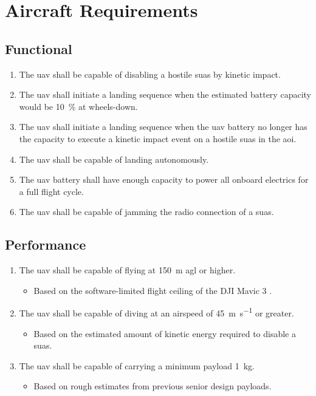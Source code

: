\chapter{Aircraft Requirements}\label{cp:aircraft_reqs}

\section{Functional}\label{sec:functional}

\begin{enumerate}
    \item The \acrshort{uav} shall be capable of disabling a hostile \acrshort{suas} by kinetic impact.
    \item The \acrshort{uav} shall initiate a landing sequence when the estimated battery capacity would be \qty{10}{\percent} at wheels-down.
    \item The \acrshort{uav} shall initiate a landing sequence when the \acrshort{uav} battery no longer has the capacity to execute a kinetic impact event on a hostile \acrshort{suas} in the \acrshort{aoi}.
    \item The \acrshort{uav} shall be capable of landing autonomously.
    \item The \acrshort{uav} battery shall have enough capacity to power all onboard electrics for a full flight cycle.
    \item The \acrshort{uav} shall be capable of jamming the radio connection of a \acrshort{suas}.
\end{enumerate}

\section{Performance}\label{sec:performance}

\begin{enumerate}
    \item The \acrshort{uav} shall be capable of flying at \qty{150}{\meter} \acrfull{agl} or higher.
    \begin{itemize}
        \item Based on the software-limited flight ceiling of the DJI Mavic 3 \citep{dji_mavic_3}.
    \end{itemize}
    \item The \acrshort{uav} shall be capable of diving at an airspeed of \qty{45}{\meter\per\second} or greater.
    \begin{itemize}
        \item Based on the estimated amount of kinetic energy required to disable a \acrshort{suas}.
    \end{itemize}
    \item The \acrshort{uav} shall be capable of carrying a minimum payload \qty{1}{\kilo\gram}.
        \begin{itemize}
            \item Based on rough estimates from previous senior design payloads.
        \end{itemize}
\end{enumerate}

